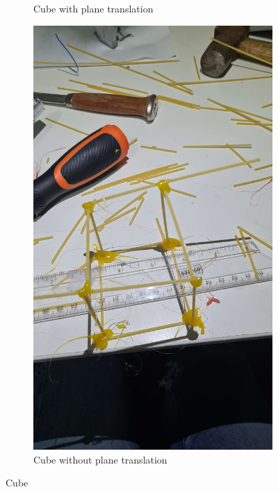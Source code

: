\documentclass{report}
\newcommand{\subimgw}{.7\linewidth}
\begin{document}
\begin{figure}[H]
\begin{subfigure}{.5\textwidth}
		\caption{Cube with plane translation}
		\label{fig:cube:a}
	\end{subfigure}%
	\begin{subfigure}{.5\textwidth}
		\centering
		\includegraphics[width=\subimgw]{cube-untranslated}

		\caption{Cube without plane translation}
		\label{fig:cube:untranslated}
	\end{subfigure}

	\caption{Cube}
	\label{fig:cube}
\end{figure}
\end{document}
